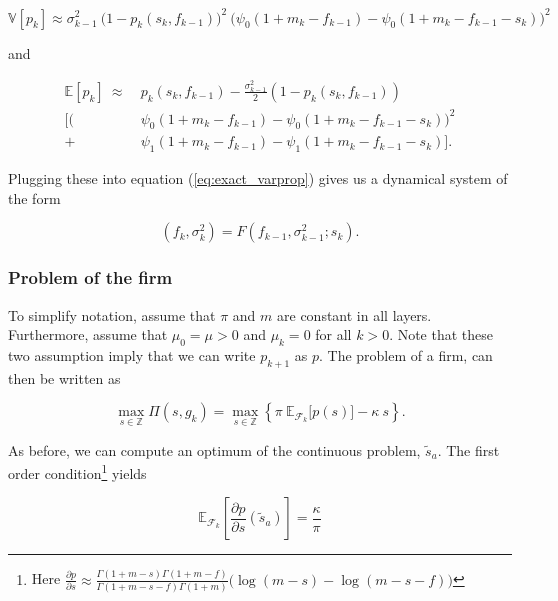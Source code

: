\documentclass[american, abstract=on]{scrartcl}
\newcommand{\F}{\mathcal{F}}
\newcommand{\E}{\mathbb{E}}
\newcommand{\V}{\mathbb{V}}
\begin{document}
\begin{equation}
  \V[p_k] \approx \sigma^2_{k-1} \ \Big( 1 - p_k(s_k, f_{k-1}) \Big)^2 \ \Big( \psi_0(1 + m_k - f_{k-1}) - \psi_0(1 + m_k - f_{k-1} - s_k) \Big)^2
\end{equation}


and

\begin{equation}
  \begin{split}
    \E[p_k] \ \approx \  &p_k(s_k, f_{k-1}) - \frac{\sigma^2_{k-1}}{2} (1 - p_k(s_k, f_{k-1})) \\
    \Big[ \Big( &\psi_0(1 + m_k - f_{k-1}) - \psi_0(1 + m_k - f_{k-1} - s_k) \Big)^2 \\
    + &\psi_1(1 + m_k - f_{k-1}) - \psi_1(1 + m_k - f_{k-1} - s_k) \Big].
  \end{split}
\end{equation}

Plugging these into equation (\ref{eq:exact_varprop}) gives us a dynamical system of the form

\begin{equation}
  (f_k, \sigma^2_k) = F(f_{k-1}, \sigma^2_{k-1}; s_k).
\end{equation}


\iffalse
\subsubsection{Problem of the firm}

To simplify notation, assume that $\pi$ and $m$ are constant in all layers. Furthermore, assume that $\mu_0 = \mu > 0$ and $\mu_k = 0$ for all $k > 0$. Note that these two assumption imply that we can write $p_{k+1}$ as $p$. The problem of a firm, can then be written as

\begin{equation}
  \max_{s \in \mathbb{Z}} \Pi(s, g_k) = \max_{s \in \mathbb{Z}} \left\{ \pi \ \E_{\F_k} \Big[ p(s) \Big] - \kappa \ s \right\}.
\end{equation}

As before, we can compute an optimum of the continuous problem, $\tilde{s}_a$. The first order condition\footnote{Here $\frac{\partial p}{\partial s} \approx \frac{\Gamma(1 + m - s) \Gamma(1 + m - f)}{\Gamma(1 + m - s - f) \Gamma(1 + m)} \Big(\log(m - s) - \log(m - s - f)\Big)$} yields

\begin{equation}
  \E_{\F_k} \left[ \frac{\partial p}{\partial s}(\tilde{s}_a ) \right] = \frac{\kappa}{\pi}
\end{equation}
\end{document}
